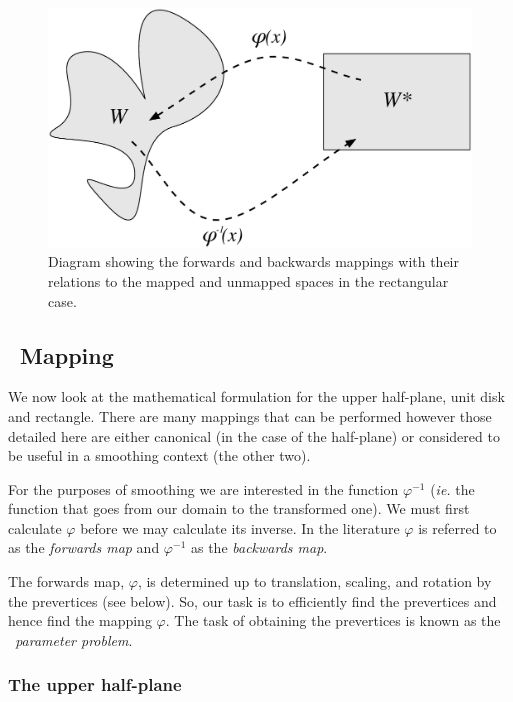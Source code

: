 \begin{figure} [tbp]
\centering
\includegraphics[scale=0.5]{sc/figs/mappingdia.pdf}
\caption{Diagram showing the forwards and backwards mappings with their relations to the mapped and unmapped spaces in the rectangular case.}
\label{mappingdia}
\end{figure}

\subsection{\sch\ Mapping}
\label{schparprob}
We now look at the mathematical formulation for the upper half-plane, unit disk and rectangle. There are many mappings that can be performed however those detailed here are either canonical (in the case of the half-plane) or considered to be useful in a smoothing context (the other two).

For the purposes of smoothing we are interested in the function $\varphi^{-1}$ (\emph{ie.} the function that goes from our domain to the transformed one). We must first calculate $\varphi$ before we may calculate its inverse. In the literature $\varphi$ is referred to as the \emph{forwards map} and $\varphi^{-1}$ as the \emph{backwards map}.

The forwards map, $\varphi$, is determined up to translation, scaling, and rotation by the prevertices (see below). So, our task is to efficiently find the prevertices and hence find the mapping $\varphi$. The task of obtaining the prevertices is known as the \emph{\sch\ parameter problem}.

\subsubsection{The upper half-plane}
\label{sc-parprob}


